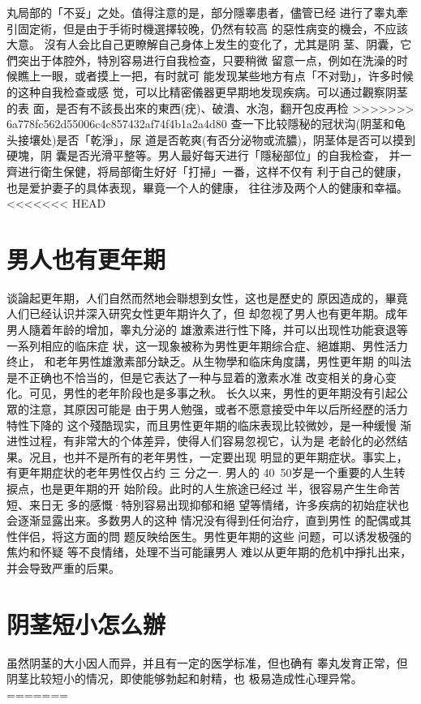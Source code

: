 \documentclass[12pt,UTF8]{ctexbook}
\begin{document}
丸局部的「不妥」之处。值得注意的是，部分隱睾患者，儘管已经
进行了睾丸牽引固定術，但是由于手術时機選擇较晚，仍然有较高
的惡性病变的機会，不应該大意。
沒有人会比自己更瞭解自己身体上发生的变化了，尤其是阴
茎、阴囊，它們突出于体腔外，特別容易进行自我检查，只要稍微
留意一点，例如在洗澡的时候瞧上一眼，或者摸上一把，有时就可
能发现某些地方有点「不对勁」，许多时候的这种自我检查或感
觉，可以比精密儀器更早期地发现疾病。可以通过觀察阴茎的表
面，是否有不該長出來的東西(疣)、破潰、水泡，翻开包皮再检
>>>>>>> 6a778fc562d55006c4c857432af74f4b1a2a4d80
查一下比较隱秘的冠状沟(阴茎和龟头接壤处)是否「乾淨」，尿
道是否乾爽(有否分泌物或流膿)，阴茎体是否可以摸到硬塊，阴
囊是否光滑平整等。男人最好每天进行「隱秘部位」的自我检查，
并一齊进行衛生保健，将局部衛生好好「打掃」一番，这样不仅有
利于自己的健康，也是爱护妻子的具体表现，畢竟一个人的健康，
往往涉及两个人的健康和幸福。
<<<<<<< HEAD

\section{男人也有更年期}
谈論起更年期，人们自然而然地会聯想到女性，这也是歷史的
原因造成的，畢竟人们已经认识并深入研究女性更年期许久了，但
却忽视了男人也有更年期。成年男人隨着年龄的增加，睾丸分泌的
雄激素进行性下降，并可以出现性功能衰退等一系列相应的临床症
状，这一现象被称为男性更年期综合症、絕雄期、男性活力终止，
和老年男性雄激素部分缺乏。从生物學和临床角度講，男性更年期
的叫法是不正确也不恰当的，但是它表达了一种与显着的激素水准
改变相关的身心变化。可见，男性的老年阶段也是多事之秋。
长久以来，男性的更年期没有引起公眾的注意，其原因可能是
由于男人勉强，或者不愿意接受中年以后所经歷的活力特性下降的
这个殘酷现实，而且男性更年期的临床表现比较微妙，是一种缓慢
渐进性过程，有非常大的个体差异，使得人们容易忽视它，认为是
老龄化的必然结果。况且，也并不是所有的老年男性，一定要出现
明显的更年期症状。事实上，有更年期症状的老年男性仅占约 三
分之一.
男人的 40~50岁是一个重要的人生转捩点，也是更年期的开
始阶段。此时的人生旅途已经过
半，很容易产生生命苦短、来日无
多的感慨·特別容易出现抑郁和絕
望等情绪，许多疾病的初始症状也
会逐渐显露出来。多数男人的这种
情况没有得到任何治疗，直到男性
的配偶或其性伴侣，将这方面的問
题反映给医生。男性更年期的这些
问题，可以诱发极强的焦灼和怀疑
等不良情绪，处理不当可能讓男人
难以从更年期的危机中掙扎出来，
并会导致严重的后果。

\section{阴茎短小怎么辦}
虽然阴茎的大小因人而异，并且有一定的医学标准，但也确有
睾丸发育正常，但阴茎比较短小的情况，即使能够勃起和射精，也
极易造成性心理异常。
=======
\end{document}
